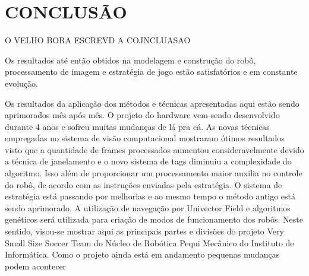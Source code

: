 \section{CONCLUSÃO}\label{conclusion}

O VELHO BORA ESCREVD A COJNCLUASAO

Os resultados até então obtidos na modelagem e construção do robô, processamento de imagem e estratégia de jogo estão satisfatórios e em constante evolução.


Os resultados da aplicação dos métodos e técnicas apresentadas aqui estão sendo aprimorados mês após mês. O projeto do hardware vem sendo desenvolvido durante 4 anos e sofreu muitas mudanças de lá pra cá.
As novas técnicas empregadas no sistema de visão computacional mostraram ótimos resultados visto que a quantidade de frames processados aumentou consideravelmente devido a técnica de janelamento e o novo sistema de tags diminuiu a complexidade do algoritmo. Isso além de proporcionar um processamento maior auxilia no controle do robô, de acordo com as instruções enviadas pela estratégia.
O sistema de estratégia está passando por melhorias e ao mesmo tempo o método antigo está sendo aprimorado. 
A utilização de navegação por Univector Field e algoritmos
genéticos será utilizada para criação de modos de funcionamento dos robôs.
Neste sentido, visou-se mostrar aqui as principais partes e
divisões do projeto Very Small Size Soccer Team do Núcleo
de Robótica Pequi Mecânico do Instituto de Informática.
Como o projeto ainda está em andamento pequenas mudanças podem acontecer
